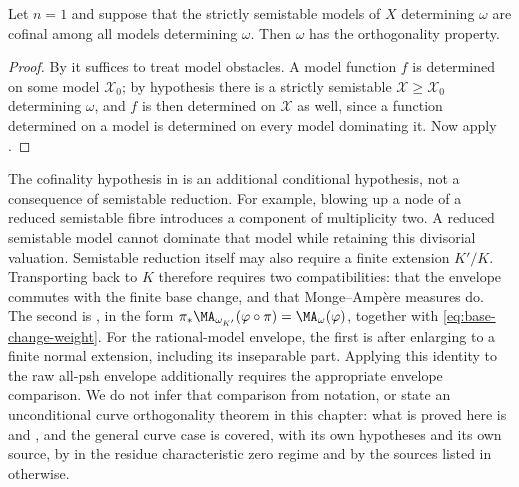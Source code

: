 \begin{corollary}
\label{cor:ch27-curve-orthogonality-global}
Let $n=1$ and suppose that the strictly semistable models of $X$
determining $\omega$ are cofinal among all models determining
$\omega$.  Then $\omega$ has the orthogonality property.
\end{corollary}

\begin{proof}
By  it suffices to treat model
obstacles.  A model function $f$ is determined on some model
$\mathcal X_0$; by hypothesis there is a strictly semistable
$\mathcal X\geq\mathcal X_0$ determining $\omega$, and $f$ is then
determined on $\mathcal X$ as well, since a function determined on a model
is determined on every model dominating it.  Now apply
.
\end{proof}

\begin{remark}
\label{rem:ch27-curve-base-change}
The cofinality hypothesis in
 is an additional conditional
hypothesis, not a consequence of semistable reduction.  For example,
blowing up a node of a reduced semistable fibre introduces a component of
multiplicity two.  A reduced semistable model cannot dominate that
model while retaining this divisorial valuation.  Semistable reduction
itself may also require a finite extension $K'/K$.  Transporting
 back to $K$ therefore requires
two compatibilities: that the envelope commutes with the finite base change,
and that Monge--Amp\`ere measures do.  The second is
, in the form
$\pi_*\MA_{\omega_{K'}}(\varphi\circ\pi)=\MA_\omega(\varphi)$, together
with \eqref{eq:base-change-weight}.  For the rational-model envelope,
the first is \cite[Proposition~2.11]{GJKM19} after enlarging to a finite
normal extension, including its inseparable part.  Applying this identity
to the raw all-psh envelope additionally requires the appropriate envelope
comparison.  We do not infer that comparison from notation, or state an
unconditional curve orthogonality theorem in this chapter: what is proved
here is  and
, and the general curve case is
covered, with its own hypotheses and its own source, by
 in the residue characteristic zero
regime and by the sources listed in
 otherwise.
\end{remark}

